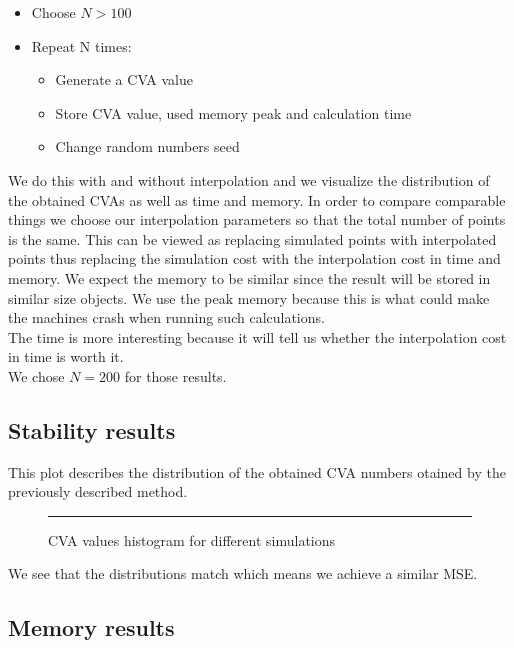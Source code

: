 \documentclass{article}
\begin{document}
\begin{itemize}
    \item Choose $N > 100$
    \item Repeat N times:
    \begin{itemize}
        \item Generate a CVA value
        \item Store CVA value, used memory peak and calculation time
        \item Change random numbers seed
    \end{itemize}
\end{itemize}

We do this with and without interpolation and we visualize the distribution of the obtained CVAs as well as time and memory. In order to compare comparable things we choose our interpolation parameters so that the total number of points is the same. This can be viewed as replacing simulated points with interpolated points thus replacing the simulation cost with the interpolation cost in time and memory. We expect the memory to be similar since the result will be stored in similar size objects. We use the peak memory because this is what could make the machines crash when running such calculations.\\

The time is more interesting because it will tell us whether the interpolation cost in time is worth it.\\

We chose $N = 200$ for those results.
\newpage
\subsection{Stability results}

This plot describes the distribution of the obtained CVA numbers otained by the previously described method.

\begin{figure}[H]
    \centering
    \rule{0.8\textwidth}{0.35\textheight} %
    \caption{CVA values histogram for different simulations}
\end{figure}

We see that the distributions match which means we achieve a similar MSE.

\subsection{Memory results}
\end{document}
